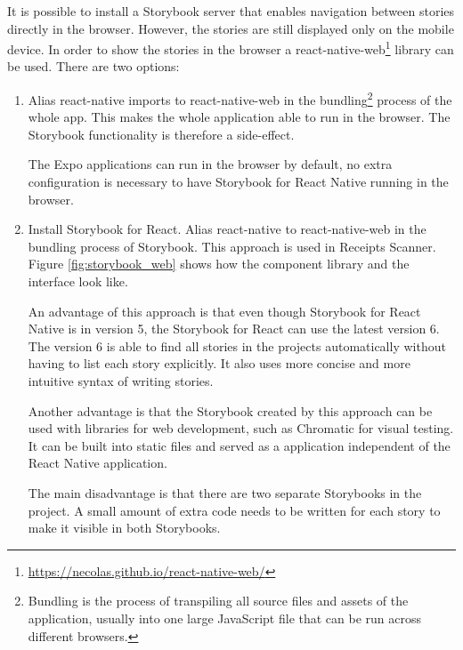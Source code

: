 \documentclass[
  digital, %
  table,   %
  oneside, %
  lof,     %
  lot,     %
]{fithesis3}
\begin{document}
It is possible to install a Storybook server that enables navigation between stories directly in the browser. However, the stories are still displayed only on the mobile device. In order to show the stories in the browser a react-native-web\footnote{\url{https://necolas.github.io/react-native-web/}} library can be used. There are two options:
\begin{enumerate}
    \item Alias react-native imports to react-native-web in the bundling\footnote{Bundling is the process of transpiling all source files and assets of the application, usually into one large JavaScript file that can be run across different browsers.} process of the whole app. This makes the whole application able to run in the browser. The Storybook functionality is therefore a side-effect.
    
    The Expo applications can run in the browser by default, no extra configuration is necessary to have Storybook for React Native running in the browser.
    
    \item Install Storybook for React. Alias react-native to react-native-web in the bundling process of Storybook. This approach is used in Receipts Scanner. Figure \ref{fig:storybook_web} shows how the component library and the interface look like.
    
    An advantage of this approach is that even though Storybook for React Native is in version 5, the Storybook for React can use the latest version 6. The version 6 is able to find all stories in the projects automatically without having to list each story explicitly. It also uses more concise and more intuitive syntax of writing stories.
    
    Another advantage is that the Storybook created by this approach can be used with libraries for web development, such as Chromatic for visual testing. It can be built into static files and served as a application independent of the React Native application.
    
    The main disadvantage is that there are two separate Storybooks in the project. A small amount of extra code needs to be written for each story to make it visible in both Storybooks. 
    
\end{enumerate}
\end{document}
